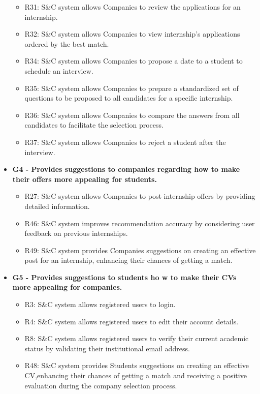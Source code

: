 \begin{itemize}
\begin{itemize}
        \item R31: S\&C system allows Companies to review the applications for an internship.
        \item R32: S\&C system allows Companies to view internship's applications ordered by the best match.
        \item R34: S\&C system allows Companies to propose a date to a student to schedule an interview.
        \item R35: S\&C system allows Companies to prepare a standardized set of questions to be proposed to all candidates for a specific internship.
        \item R36: S\&C system allows Companies to compare the answers from all candidates to facilitate the selection process.
        \item R37: S\&C system allows Companies to reject a student after the interview.
    \end{itemize}
    \item \textbf{G4 - Provides suggestions to companies regarding how to make their offers more appealing for students.}
    \begin{itemize}
        \item R27: S\&C system allows Companies to post internship offers by providing detailed information.
        \item R46: S\&C system improves recommendation accuracy by considering user feedback on previous internships.
        \item R49: S\&C system provides Companies suggestions on creating an effective post for an internship, enhancing their chances of getting a match.
    \end{itemize}
    \item \textbf{G5 - Provides suggestions to students ho w to make their CVs more appealing for companies.}
    \begin{itemize}
        \item R3: S\&C system allows registered users to login.
        \item R4: S\&C system allows registered users to edit their account details.
        \item R8: S\&C system allows registered users to verify their current academic status by validating their institutional email address.
        \item R48: S\&C system provides Students suggestions on creating an effective CV,enhancing their chances of getting a match and receiving a positive evaluation during the company selection process.

\end{itemize}
\end{itemize}
